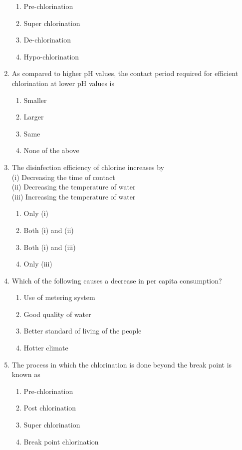 \documentclass[11pt,a4paper]{article}
\begin{document}
\begin{enumerate}
\begin{enumerate}[label=\Alph*.]
\item{Pre-chlorination}
\item{Super chlorination}
\item{De-chlorination}
\item{Hypo-chlorination}
\end{enumerate}
\item{As compared to higher pH values, the contact period required for efficient chlorination at lower pH values is}
\begin{enumerate}[label=\Alph*.]
\item{Smaller}
\item{Larger}
\item{Same}
\item{None of the above}
\end{enumerate}
\item{The disinfection efficiency of chlorine increases by \\
 (i) Decreasing the time of contact \\
 (ii) Decreasing the temperature of water \\
 (iii) Increasing the temperature of water}
\begin{enumerate}[label=\Alph*.]
\item{Only (i)}
\item{Both (i) and (ii)}
\item{Both (i) and (iii)}
\item{Only (iii)}
\end{enumerate}
\item{Which of the following causes a decrease in per capita consumption?}
\begin{enumerate}[label=\Alph*.]
\item{Use of metering system}
\item{Good quality of water}
\item{Better standard of living of the people}
\item{Hotter climate}
\end{enumerate}
\item{The process in which the chlorination is done beyond the break point is known as}
\begin{enumerate}[label=\Alph*.]
\item{Pre-chlorination}
\item{Post chlorination}
\item{Super chlorination}
\item{Break point chlorination}

\end{enumerate}
\end{enumerate}
\end{document}
